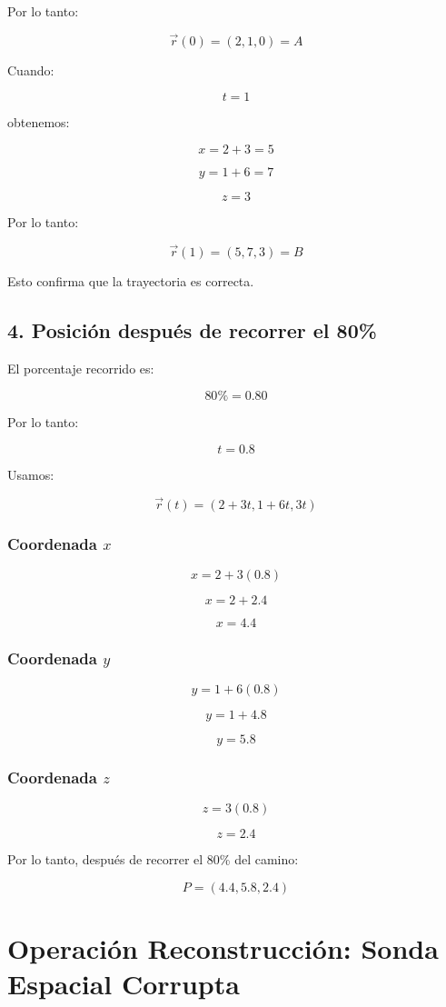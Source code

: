 \documentclass[12pt,a4paper]{article}
\begin{document}
Por lo tanto:

\[\vec{r}(0)=(2,1,0)=A\]

Cuando:

\[t=1\]

obtenemos:

\[x=2+3=5\]

\[y=1+6=7\]

\[z=3\]

Por lo tanto:

\[\vec{r}(1)=(5,7,3)=B\]

Esto confirma que la trayectoria es correcta.

\subsection{4. Posición después de recorrer el 80\%}

El porcentaje recorrido es:

\[80\%=0.80\]

Por lo tanto:

\[t=0.8\]

Usamos:

\[\vec{r}(t)=(2+3t,1+6t,3t)\]


\subsubsection{Coordenada $x$}

\[x=2+3(0.8)\]

\[x=2+2.4\]

\[\boxed{x=4.4}\]

\subsubsection{Coordenada $y$}

\[y=1+6(0.8)\]

\[y=1+4.8\]

\[\boxed{y=5.8}\]

\subsubsection{Coordenada $z$}

\[z=3(0.8)\]

\[\boxed{z=2.4}\]

Por lo tanto, después de recorrer el 80\% del camino:

\[\boxed{P=(4.4,5.8,2.4)}\]

\section{Operación Reconstrucción: Sonda Espacial Corrupta}
\end{document}
